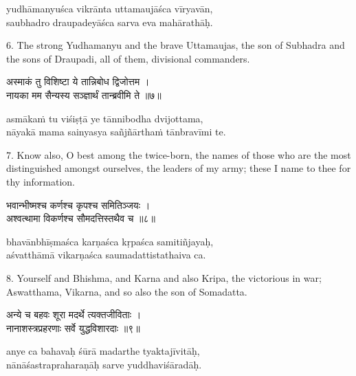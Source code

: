 \begin{transliteration}
yudhāmanyuśca vikrānta uttamaujāśca vīryavān, \\
saubhadro draupadeyāśca sarva eva mahārathāḥ.
\end{transliteration}

6. The strong Yudhamanyu and the brave Uttamaujas, the son of Subhadra and the
sons of Draupadi, all of them, divisional commanders.

\begin{gitaverse}
अस्माकं तु विशिष्टा ये तान्निबोध द्विजोत्तम । \\
नायका मम सैन्यस्य सञ्ज्ञार्थं तान्ब्रवीमि ते ॥७॥
\end{gitaverse}

\begin{transliteration}
asmākaṁ tu viśiṣṭā ye tānnibodha dvijottama, \\
nāyakā mama sainyasya sañjñārthaṁ tānbravīmi te.
\end{transliteration}

7. Know also, O best among the twice-born, the names of those who are the most
distinguished amongst ourselves, the leaders of my army; these I name to thee
for thy information.

\begin{gitaverse}
भवान्भीष्मश्च कर्णश्च कृपश्च समितिञ्जयः । \\
अश्वत्थामा विकर्णश्च सौमदत्तिस्तथैव च ॥८॥
\end{gitaverse}

\begin{transliteration}
bhavānbhīṣmaśca karṇaśca kṛpaśca samitiñjayaḥ, \\
aśvatthāmā vikarṇaśca saumadattistathaiva ca.
\end{transliteration}

8. Yourself and Bhishma, and Karna and also Kripa, the victorious in war;
Aswatthama, Vikarna, and so also the son of Somadatta.

\begin{gitaverse}
अन्ये च बहवः शूरा मदर्थे त्यक्तजीविताः । \\
नानाशस्त्रप्रहरणाः सर्वे युद्धविशारदाः ॥९॥
\end{gitaverse}

\begin{transliteration}
anye ca bahavaḥ śūrā madarthe tyaktajīvitāḥ, \\
nānāśastrapraharaṇāḥ sarve yuddhaviśāradāḥ.
\end{transliteration}

